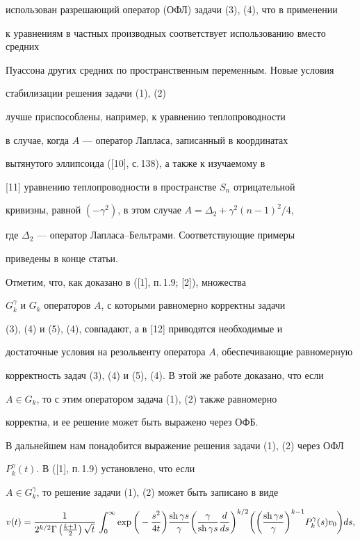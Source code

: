 использован разрешающий оператор (ОФЛ) задачи (3), (4), что в применении 


к уравнениям в частных производных соответствует использованию вместо средних 


Пуассона других средних по пространственным переменным. Новые условия 


стабилизации решения задачи (1), (2)


лучше приспособлены, например, к уравнению теплопроводности 


в случае, когда $A$ --- оператор Лапласа, записанный в координатах 


вытянутого эллипсоида ([10], с.\,138), а также к изучаемому в 


[11] уравнению теплопроводности в пространстве $S_n$ отрицательной 


кривизны, равной $(-\gamma^2)$, в этом случае $A=\Delta_2+\gamma^2 (n-1)^2/4$, 


где $\Delta_2$ --- оператор Лапласа--Бельтрами. Соответствующие примеры 


приведены в конце статьи.





Отметим, что, как доказано в ([1], п.\,1.9; [2]), множества 


$G_k^\gamma$ и $G_k$ операторов $A$, с которыми равномерно корректны задачи 


(3), (4) и (5), (4), совпадают, а в [12] приводятся необходимые и 


достаточные условия на резольвенту оператора $A$, обеспечивающие равномерную 


корректность задач (3), (4) и (5), (4). В этой же работе доказано, что если 


$A \in G_k$, то с этим оператором задача (1), (2) также равномерно 


корректна, и ее решение может быть выражено через ОФБ.





В дальнейшем нам понадобится выражение решения задачи (1), (2) через ОФЛ 


$P_k^\gamma(t)$. В ([1], п.\,1.9) установлено, что если 


$A\in G_k^\gamma$, то решение задачи (1), (2) может быть записано в виде    


\begin{equation}


v(t)=\frac{1}{2^{k/2}\Gamma\left (\frac{k+1}{2} \right )\sqrt t}\,


\int_0^\infty \exp\bigg (-\frac{s^2}{4t}\bigg )


\frac{\sh \gamma s}{\gamma}


\bigg(\frac{\gamma}{\sh \gamma s} \frac{d}{ds}\bigg)^{k/2}


\bigg(\bigg(\frac{\sh \gamma s}{\gamma}\bigg)^{k-1}


P_k^\gamma(s)v_0\bigg) ds,


\end{equation}


